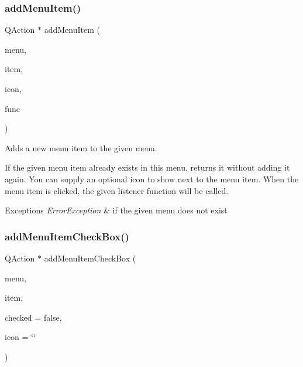 \subsubsection{\texorpdfstring{add\+Menu\+Item()}{addMenuItem()}\hspace{0.1cm}{\footnotesize\ttfamily [4/4]}}
{\footnotesize\ttfamily Q\+Action $\ast$ add\+Menu\+Item (\begin{DoxyParamCaption}\item[{const std\+::string \&}]{menu,  }\item[{const std\+::string \&}]{item,  }\item[{const Q\+Pixmap \&}]{icon,  }\item[{\mbox{\hyperlink{namespacesgl_a54427ce97bb1c2804e4fe2b0a62e8b17}{G\+Event\+Listener\+Void}}}]{func }\end{DoxyParamCaption})\hspace{0.3cm}{\ttfamily [virtual]}}



Adds a new menu item to the given menu. 

If the given menu item already exists in this menu, returns it without adding it again. You can supply an optional icon to show next to the menu item. When the menu item is clicked, the given listener function will be called. 
\begin{DoxyExceptions}{Exceptions}
{\em Error\+Exception} & if the given menu does not exist \\
\hline
\end{DoxyExceptions}
\mbox{\label{classsgl_1_1GWindow_ae363de5d4c0d5848a5936563b12c3288}} 
\subsubsection{\texorpdfstring{add\+Menu\+Item\+Check\+Box()}{addMenuItemCheckBox()}\hspace{0.1cm}{\footnotesize\ttfamily [1/2]}}
{\footnotesize\ttfamily Q\+Action $\ast$ add\+Menu\+Item\+Check\+Box (\begin{DoxyParamCaption}\item[{const std\+::string \&}]{menu,  }\item[{const std\+::string \&}]{item,  }\item[{bool}]{checked = {\ttfamily false},  }\item[{const std\+::string \&}]{icon = {\ttfamily \char`\"{}\char`\"{}} }\end{DoxyParamCaption})\hspace{0.3cm}{\ttfamily [virtual]}}



